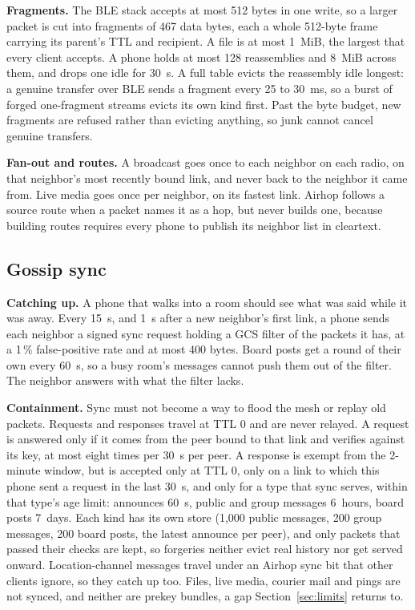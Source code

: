 \documentclass[conference]{IEEEtran}
\begin{document}
\textbf{Fragments.} The BLE stack accepts at most 512 bytes in one write, so a larger packet is cut into fragments of 467 data bytes, each a whole 512-byte frame carrying its parent's TTL and recipient. A file is at most 1~MiB, the largest that every client accepts. A phone holds at most 128 reassemblies and 8~MiB across them, and drops one idle for 30~s. A full table evicts the reassembly idle longest: a genuine transfer over BLE sends a fragment every 25 to 30~ms, so a burst of forged one-fragment streams evicts its own kind first. Past the byte budget, new fragments are refused rather than evicting anything, so junk cannot cancel genuine transfers.

\textbf{Fan-out and routes.} A broadcast goes once to each neighbor on each radio, on that neighbor's most recently bound link, and never back to the neighbor it came from. Live media goes once per neighbor, on its fastest link. Airhop follows a source route when a packet names it as a hop, but never builds one, because building routes requires every phone to publish its neighbor list in cleartext.

\subsection{Gossip sync}
\label{sec:sync}

\textbf{Catching up.} A phone that walks into a room should see what was said while it was away. Every 15~s, and 1~s after a new neighbor's first link, a phone sends each neighbor a signed sync request holding a GCS filter of the packets it has, at a 1\,\% false-positive rate and at most 400 bytes. Board posts get a round of their own every 60~s, so a busy room's messages cannot push them out of the filter. The neighbor answers with what the filter lacks.

\textbf{Containment.} Sync must not become a way to flood the mesh or replay old packets. Requests and responses travel at TTL 0 and are never relayed. A request is answered only if it comes from the peer bound to that link and verifies against its key, at most eight times per 30~s per peer. A response is exempt from the 2-minute window, but is accepted only at TTL 0, only on a link to which this phone sent a request in the last 30~s, and only for a type that sync serves, within that type's age limit: announces 60~s, public and group messages 6~hours, board posts 7~days. Each kind has its own store (1,000 public messages, 200 group messages, 200 board posts, the latest announce per peer), and only packets that passed their checks are kept, so forgeries neither evict real history nor get served onward. Location-channel messages travel under an Airhop sync bit that other clients ignore, so they catch up too. Files, live media, courier mail and pings are not synced, and neither are prekey bundles, a gap Section~\ref{sec:limits} returns to.
\end{document}

